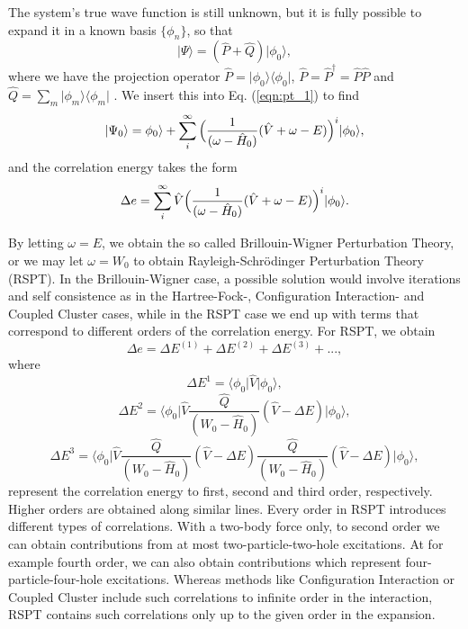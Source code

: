 The system's true wave function is still unknown, but it is fully
possible to expand it in a known basis $\{\phi_n \}$, so that
\begin{equation}
\vert \Psi \rangle = (\hat{P} + \hat{Q})\vert \phi_0 \rangle,
\end{equation}
where we have the projection operator $\hat{P} = \vert \phi_0 \rangle \langle \phi_0 \vert$, $\hat{P} = \hat{P}^\dagger = \hat{P}\hat{P}$ and $\hat{Q} = \sum_{m} \vert \phi_m \rangle \langle \phi_m \vert$ \cite{ShavittBartlett2009}. 
We insert this into Eq. (\ref{eqn:pt_1}) to find
\begin{equation}
\vert \Psi_0  \rangle = \phi_0 \rangle + \sum_i^\infty \Big{(} \frac{1}{(\omega - \hat{H}_0)} (\hat{V} + \omega - E) \Big{)}^i \vert \phi_0 \rangle ,
\label{eqn:pt_2}
\end{equation}
and the correlation energy takes the form
\begin{equation}
\Delta e = \sum_i^\infty  \hat{V} \Big{(} \frac{1}{(\omega - \hat{H}_0)} (\hat{V} + \omega - E) \Big{)}^i \vert \phi_0 \rangle .
\label{eqn:pt_2}
\end{equation}

By letting $\omega = E$, we obtain the so called Brillouin-Wigner
Perturbation Theory, or we may let $\omega = W_0$ to obtain
Rayleigh-Schrödinger Perturbation Theory (RSPT). In the
Brillouin-Wigner case, a possible solution would involve iterations
and self consistence as in the Hartree-Fock-, Configuration Interaction- and Coupled Cluster cases, while in the RSPT
case we end up with terms that correspond to different orders of the
correlation energy. For RSPT, we obtain
\begin{equation}
\Delta e = \Delta E^{(1)}+\Delta E^{(2)}+\Delta E^{(3)}+... ,
\end{equation}
where
\begin{equation}
\Delta E^{1} = \langle \phi_0 \vert \hat{V} \vert \phi_0 \rangle,
\end{equation}
\begin{equation}
\Delta E^{2} = \langle \phi_0 \vert \hat{V}  \frac{\hat{Q}}{(W_0 - \hat{H}_0)}  (\hat{V} - \Delta E) \vert \phi_0 \rangle,
\end{equation}
\begin{equation}
\Delta E^{3} = \langle \phi_0 \vert \hat{V} \frac{\hat{Q}}{(W_0 - \hat{H}_0)}  (\hat{V} - \Delta E) \frac{\hat{Q}}{(W_0 - \hat{H}_0)}  (\hat{V} - \Delta E)  \vert \phi_0 \rangle,
\end{equation}
represent the correlation energy to first, second and third order, respectively. Higher orders are obtained along similar lines. Every order in RSPT introduces different types of correlations. With a two-body force only, to second order we can obtain contributions from at most two-particle-two-hole excitations. At for example fourth order, we can also obtain contributions
which represent four-particle-four-hole  excitations.  
Whereas methods like Configuration Interaction or Coupled Cluster include such correlations 
to infinite order in the interaction, RSPT contains such correlations only up to the given order in the expansion.



